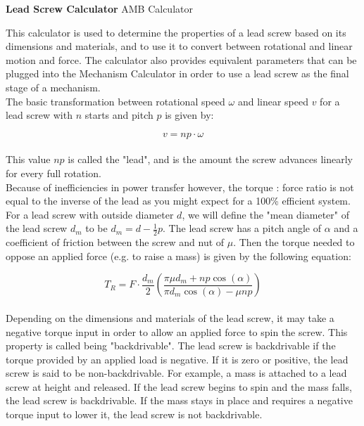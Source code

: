 \documentclass[a4paper]{article}
\begin{document}
	
	\Huge\textbf{Lead Screw Calculator}
	\newline
	\LARGE AMB Calculator
	
	\vspace{0.5cm}
	\normalsize
	
	This calculator is used to determine the properties of a lead screw based on its dimensions and materials, and to use it to convert between rotational and linear motion and force. The calculator also provides equivalent parameters that can be plugged into the Mechanism Calculator in order to use a lead screw as the final stage of a mechanism.\\
	
	The basic transformation between rotational speed $ \omega $ and linear speed $ v $ for a lead screw with $ n $ starts and pitch $ p $ is given by:
	
	\begin{equation}
		v = np \cdot \omega
	\end{equation}
	\\
	This value $ np $ is called the "lead", and is the amount the screw advances linearly for every full rotation.\\
	
	Because of inefficiencies in power transfer however, the torque : force ratio is not equal to the inverse of the lead as you might expect for a 100\% efficient system. For a lead screw with outside diameter $ d $, we will define the "mean diameter" of the lead screw $ d_m $ to be $ d_m = d - \frac{1}{2} p $. The lead screw has a pitch angle of $ \alpha $ and a coefficient of friction between the screw and nut of $ \mu $. Then the torque needed to oppose an applied force (e.g. to raise a mass) is given by the following equation:
	
	\begin{equation}
		T_R = F \cdot \frac{d_m}{2} \left( \frac{\pi \mu d_m + n p \cos (\alpha)}{\pi d_m \cos (\alpha) - \mu n p} \right)
	\end{equation}
	\\
	Depending on the dimensions and materials of the lead screw, it may take a negative torque input in order to allow an applied force to spin the screw. This property is called being "backdrivable". The lead screw is backdrivable if the torque provided by an applied load is negative. If it is zero or positive, the lead screw is said to be non-backdrivable. For example, a mass is attached to a lead screw at height and released. If the lead screw begins to spin and the mass falls, the lead screw is backdrivable. If the mass stays in place and requires a negative torque input to lower it, the lead screw is not backdrivable.
	
\end{document}
